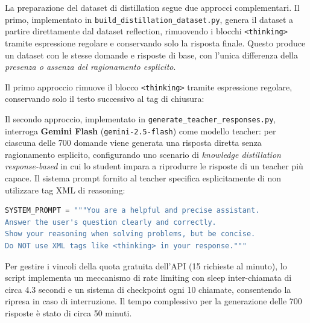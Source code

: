 La preparazione del dataset di distillation segue due approcci
complementari. Il primo, implementato in
\texttt{build\_distillation\_dataset.py}, genera il dataset a partire
direttamente dal dataset reflection, rimuovendo i blocchi
\texttt{<thinking>} tramite espressione regolare e conservando solo
la risposta finale. Questo produce un dataset con le stesse domande
e risposte di base, con l'unica differenza della \emph{presenza o
assenza del ragionamento esplicito}.

Il primo approccio rimuove il blocco \texttt{<thinking>} tramite
espressione regolare, conservando solo il testo successivo al tag
di chiusura:

Il secondo approccio, implementato in
\texttt{generate\_teacher\_responses.py}, interroga \textbf{Gemini
Flash} (\texttt{gemini-2.5-flash}) come modello teacher: per
ciascuna delle 700 domande viene generata una risposta diretta senza
ragionamento esplicito, configurando uno scenario di \emph{knowledge
distillation response-based} in cui lo student impara a riprodurre
le risposte di un teacher più capace. Il sistema prompt fornito al
teacher specifica esplicitamente di non utilizzare tag XML di
reasoning:

\begin{lstlisting}[language=Python, caption={System prompt inviato a Gemini Flash come teacher.}, float=tbp]
SYSTEM_PROMPT = """You are a helpful and precise assistant.
Answer the user's question clearly and correctly.
Show your reasoning when solving problems, but be concise.
Do NOT use XML tags like <thinking> in your response."""
\end{lstlisting}

Per gestire i vincoli della quota gratuita dell'API (15 richieste al
minuto), lo script implementa un meccanismo di rate limiting con sleep
inter-chiamata di circa 4.3 secondi e un sistema di checkpoint ogni
10 chiamate, consentendo la ripresa in caso di interruzione. Il tempo
complessivo per la generazione delle 700 risposte è stato di circa
50 minuti.

\FloatBarrier

